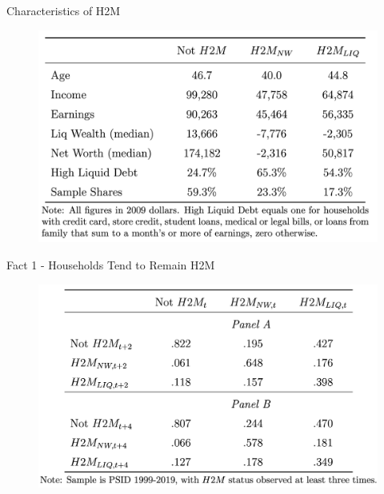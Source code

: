 \documentclass{beamer}
\begin{document}
\begin{frame}{Characteristics of H2M}
	\begin{figure}
		\centering
		\includegraphics[width=0.7\linewidth]{Figures/Table2.png}
	\end{figure}
\end{frame}

\begin{frame}{Fact 1 - 
	Households Tend to Remain H2M}
	\begin{figure}
		\centering
		\includegraphics[width=0.7\linewidth]{Figures/Table3.png}
	\end{figure}
\end{frame}
\end{document}
